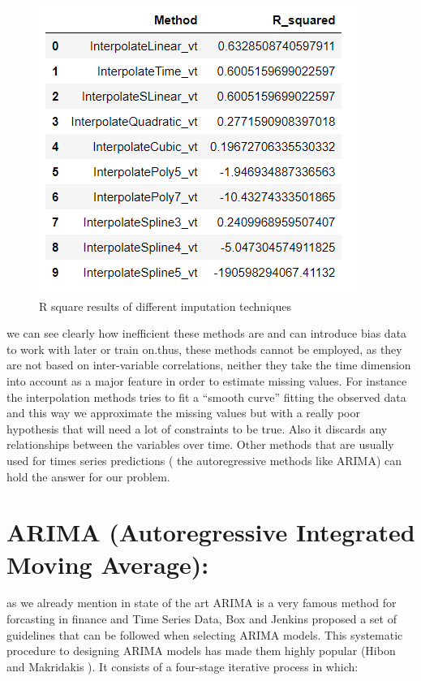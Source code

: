 \begin{figure}
\centering
\includegraphics[width=.37\textwidth]{img/results_R.png} 
\caption{R square results of different imputation techniques }
\label{fig:score}
\end{figure}
we can see clearly how inefficient these methods are and can introduce bias data to work with later or train on.thus, these methods cannot be employed, as they are not  based on inter-variable correlations, neither they take the time dimension into account as a major feature in order to estimate missing values. For instance the interpolation methods tries to fit a “smooth curve” fitting the observed data and this way we approximate the missing values but with a really poor hypothesis that will need a lot of constraints to be true. Also it discards any relationships between the variables over time. Other methods that are usually used for times series predictions ( the autoregressive methods like ARIMA) can hold the answer for our problem.


\section{ ARIMA (Autoregressive Integrated Moving Average):}
as we already mention in state of the art ARIMA is a very famous method for forcasting in finance and Time Series Data,  
Box and Jenkins proposed a set of guidelines that can be followed when
selecting ARIMA models. This systematic procedure to designing ARIMA
models has made them highly popular (Hibon and Makridakis
\cite{Hibonand_Makridakis}).  It consists of a four-stage iterative process in which:

